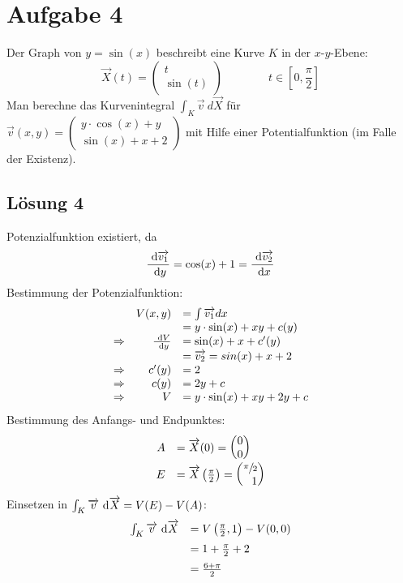 \documentclass[main.tex]{subfiles}
\begin{document}
\section{Aufgabe 4}
Der Graph von $y = \sin(x)$ beschreibt eine Kurve $K$ in der $x$-$y$-Ebene: 
\[
\vec{X}(t)
= \left( \begin{array}{cc}
	t \\ 
	\sin(t)
\end{array} \right)
%
\qquad \qquad
%
t \in \left[ 0,\frac{\pi}{2}\right] 
\]
%
Man berechne das Kurvenintegral $\int_K\vec{v} \ d\vec{X}$ für 
$\vec{v}(x,y)
= \left( \begin{array}{cc}
	y \cdot \cos \left( x \right) + y \\ 
	\sin \left( x \right) +x+2
\end{array} \right)$
mit Hilfe einer Potentialfunktion (im Falle der Existenz).

\subsection{Lösung 4}
Potenzialfunktion existiert, da
\[
	\frac{~\mathrm{d}\overrightarrow{v_1}}{~\mathrm{d}y} = \cos(x)+1 = \frac{~\mathrm{d}\overrightarrow{v_2}}{~\mathrm{d}x}
\]
Bestimmung der Potenzialfunktion:
\begin{align*}
	\begin{array}{rrl}
		& V(x,y) & =  \int \overrightarrow{v_1} dx\\
		&& = y\cdot \sin(x) + xy+c(y)\\
		\Rightarrow & \frac{~\mathrm{d}V}{~\mathrm{d}y} & = \sin(x) + x + c'(y)\\
		&& = \overrightarrow{v_2} = sin(x) + x + 2\\
		\Rightarrow & c'(y) & = 2\\
		\Rightarrow & c(y) & = 2y+c\\
		\Rightarrow & V & = y\cdot \sin(x) + xy + 2y+c
	\end{array}
\end{align*}
Bestimmung des Anfangs- und Endpunktes:
\begin{align*}
	\begin{array}{rl}
		A & = \vec{X}(0) = \vektor{0\\0}\\
		E & = \vec{X}\left(\frac{\pi}{2}\right) = \vektor{\sfrac{\pi}{2}\\1}
	\end{array}
\end{align*}
Einsetzen in $\int_K \overrightarrow{v} ~\mathrm{d}\overrightarrow{X} = V(E)-V(A)$:
\begin{align*}
	\begin{array}{rl}
		\int_K \overrightarrow{v} ~\mathrm{d}\overrightarrow{X} & = V\left(\frac{\pi}{2}, 1\right) - V(0,0)\\[2mm]
		& = 1 + \frac{\pi}{2} + 2\\[2mm]
		& = \frac{6+\pi}{2}
	\end{array}
\end{align*}
\end{document}
